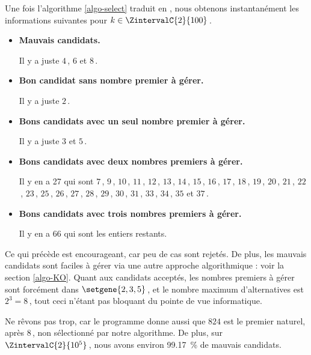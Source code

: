 Une fois l'algorithme \ref{algo-select} traduit en \python, nous obtenons instantanément les informations suivantes pour $k \in \ZintervalC{2}{100}$\,.
%
\begin{itemize}
	\item \textbf{Mauvais candidats.}
	
	\noindent
	Il y a juste $4$\,, $6$ et $8$\,.
	
	\item \textbf{Bon candidat sans nombre premier à gérer.}
	
	\noindent
	Il y a juste $2$\,.
	
	
	\item \textbf{Bons candidats avec un seul nombre premier à gérer.}
	
	\noindent
	Il y a juste $3$ et $5$\,.
	
	\item \textbf{Bons candidats avec deux nombres premiers à gérer.}
	
	\noindent
	Il y en a 27 qui sont $7$\,, $9$\,, $10$\,, $11$\,, $12$\,, $13$\,, $14$\,, $15$\,, $16$\,, $17$\,, $18$\,, $19$\,, $20$\,, $21$\,, $22$\,, $23$\,, $25$\,, $26$\,, $27$\,, $28$\,, $29$\,, $30$\,, $31$\,, $33$\,, $34$\,, $35$ et $37$\,.

	\item\textbf{Bons candidats avec trois nombres premiers à gérer.}
	
	\noindent
	Il y en a 66 qui sont les entiers restants.
\end{itemize}


Ce qui précède est encourageant, car peu de cas sont rejetés.
De plus, les mauvais candidats sont faciles à gérer via une autre approche algorithmique : voir la section \ref{algo-KO}.
Quant aux candidats acceptés, les nombres premiers à gérer sont forcément dans $\setgene{2, 3, 5}$\,, et le nombre maximum d'alternatives est $2^3 = 8$\,, tout ceci n'étant pas bloquant du pointe de vue informatique.
 



\begin{remark} \label{biggest-winner}
	Ne rêvons pas trop, car le programme donne aussi que $824$ est le premier naturel, après $8$\,, non sélectionné par notre algorithme.
	De plus, sur $\ZintervalC{2}{10^5}$\,, nous avons environ \qty{99.17}{\percent} de mauvais candidats.
\end{remark}

